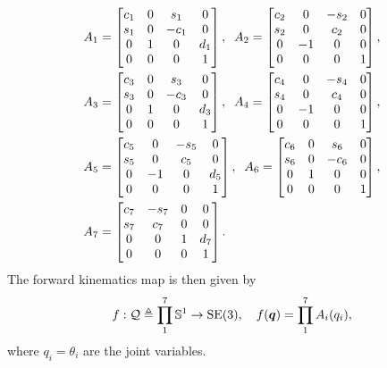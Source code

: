 \begin{align}
  \begin{split}
    A_1 &= \begin{bmatrix} c_1 & 0 & s_1 & 0 \\ s_1 & 0 & -c_1 & 0 \\ 0 & 1 & 0 & d_1 \\ 0 & 0 & 0 & 1\end{bmatrix}, \;\;
    A_2 = \begin{bmatrix} c_2 & 0 & -s_2 & 0 \\ s_2 & 0 & c_2 & 0 \\ 0 & -1 & 0 & 0 \\ 0 & 0 & 0 & 1\end{bmatrix}, \\
    A_3 &= \begin{bmatrix} c_3 & 0 & s_3 & 0 \\ s_3 & 0 & -c_3 & 0 \\ 0 & 1 & 0 & d_3 \\ 0 & 0 & 0 & 1\end{bmatrix}, \;\;
    A_4 = \begin{bmatrix} c_4 & 0 & -s_4 & 0 \\ s_4 & 0 & c_4 & 0 \\ 0 & -1 & 0 & 0 \\ 0 & 0 & 0 & 1\end{bmatrix}, \\
    A_5 &= \begin{bmatrix} c_5 & 0 & -s_5 & 0 \\ s_5 & 0 & c_5 & 0 \\ 0 & -1 & 0 & d_5 \\ 0 & 0 & 0 & 1\end{bmatrix}, \;\;
    A_6 = \begin{bmatrix} c_6 & 0 & s_6 & 0 \\ s_6 & 0 & -c_6 & 0 \\ 0 & 1 & 0 & 0 \\ 0 & 0 & 0 & 1\end{bmatrix}, \\
    A_7 &= \begin{bmatrix} c_7 & -s_7 & 0 & 0 \\ s_7 & c_7 & 0 & 0 \\ 0 & 0 & 1 & d_7 \\ 0 & 0 & 0 & 1\end{bmatrix}. \\
  \end{split}
\end{align}
%
The forward kinematics map is then given by \[ f: \mathcal{Q} \triangleq \prod_1^7
\mathbb{S}^1 \rightarrow \mathrm{SE}(3), \quad f(\bm{q}) = \prod_1^7 A_i(q_i), \]
%
where $q_i = \theta_i$ are the joint variables.

